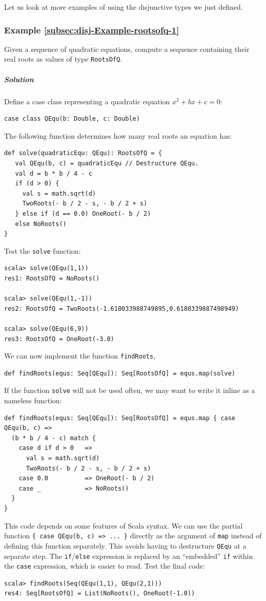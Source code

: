 Let us look at more examples of using the disjunctive types we just
defined.

\subsubsection{Example \label{subsec:disj-Example-rootsofq-1}\ref{subsec:disj-Example-rootsofq-1}}

Given a sequence of quadratic equations, compute a sequence containing
their real roots as values of type \lstinline!RootsOfQ!.

\subparagraph{Solution}

Define a case class representing a quadratic equation $x^{2}+bx+c=0$:
\begin{lstlisting}
case class QEqu(b: Double, c: Double)
\end{lstlisting}
The following function determines how many real roots an equation
has:
\begin{lstlisting}
def solve(quadraticEqu: QEqu): RootsOfQ = {
   val QEqu(b, c) = quadraticEqu // Destructure QEqu.
   val d = b * b / 4 - c
   if (d > 0) {
     val s = math.sqrt(d)
     TwoRoots(- b / 2 - s, - b / 2 + s)
   } else if (d == 0.0) OneRoot(- b / 2)
   else NoRoots()
}
\end{lstlisting}
Test the \lstinline!solve! function:
\begin{lstlisting}
scala> solve(QEqu(1,1))
res1: RootsOfQ = NoRoots()

scala> solve(QEqu(1,-1))
res2: RootsOfQ = TwoRoots(-1.618033988749895,0.6180339887498949) 

scala> solve(QEqu(6,9))
res3: RootsOfQ = OneRoot(-3.0) 
\end{lstlisting}
We can now implement the function \lstinline!findRoots!,
\begin{lstlisting}
def findRoots(equs: Seq[QEqu]): Seq[RootsOfQ] = equs.map(solve)
\end{lstlisting}
If the function \lstinline!solve! will not be used often, we may
want to write it inline as a nameless function:
\begin{lstlisting}
def findRoots(equs: Seq[QEqu]): Seq[RootsOfQ] = equs.map { case QEqu(b, c) =>
  (b * b / 4 - c) match {
    case d if d > 0   =>
      val s = math.sqrt(d)
      TwoRoots(- b / 2 - s, - b / 2 + s)
    case 0.0          => OneRoot(- b / 2)
    case _            => NoRoots()
  }
}
\end{lstlisting}
This code depends on some features of Scala syntax. We can use the
partial function \lstinline!{ case QEqu(b, c) => ... }! directly
as the argument of \lstinline!map! instead of defining this function
separately. This avoids having to destructure \lstinline!QEqu! at
a separate step. The \lstinline!if!/\lstinline!else! expression
is replaced by an \textsf{``}embedded\textsf{''}
\lstinline!if! within the \lstinline!case! expression, which is
easier to read. Test the final code:
\begin{lstlisting}
scala> findRoots(Seq(QEqu(1,1), QEqu(2,1)))
res4: Seq[RootsOfQ] = List(NoRoots(), OneRoot(-1.0)) 
\end{lstlisting}


